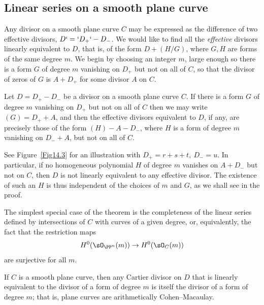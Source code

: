 \subsection{Linear series on a smooth plane curve}\label{linear series on smooth plane curves}

Any divisor on a smooth plane curve $C$ may be expressed as the difference of
%
two
effective divisors,
$D`=` D_{+}`-\nobreak D_{-}$. We would like to find all the \emph{effective} divisors
%
linearly equivalent
to $D$, that is, of the form
$D + (H/G)$, where $G, H$ are forms of the same degree $m$. We begin by choosing
an integer $m$, large enough so there is a form $G$ of degree $m$ vanishing on $D_+$ but not on all of $C$, so
that the divisor of zeros of $G$ is $A+D_+$ for some divisor $A$ on $C$.

\begin{theorem}\label{equiv on smooth plane curve}
Let $D= D_{+}-D_{-}$ be a divisor on
a
smooth plane curve $C$. If
there is a form $G$ of degree $m$ vanishing on $D_{+}$ but not on all of $C$
then we may write $(G) = D_{+}+A$, and then
the effective divisors equivalent to $D$, if any, are precisely those
of the form $(H) - A -D_{-}$, where $H$
is a form of degree $m$ vanishing on $D_{-}+A$, but not on all of $C$.
\end{theorem}

See Figure~\ref{Fig14.3} for an illustration with $D_+ = r+s+t, \ D_- = u$.
In particular, if no homogeneous polynomial $H$ of degree $m$ vanishes on  $A + D_{-}$ but not on $C$, then $D$ is not linearly equivalent to any effective divisor. The existence of such an $H$ is thus independent of the choices of $m$ and $G$, as we shall see in the proof.

The simplest special case of the theorem is the completeness
%
of the linear series defined
by intersections of $C$ with curves of a given degree,
or, equivalently, the fact that the restriction maps
$$
H^{0}(\sO_{\PP^{n}}(m)) \to H^{0}(\sO_{C}(m))
$$
are surjective for all $m$.

\begin{proposition}\label {completeness of hyperplanes on plane curve}
If $C$ is a smooth plane curve, then any Cartier divisor on $D$ that is linearly equivalent to the divisor of
a form of degree $m$ is itself the divisor of a form of degree $m$; that is, plane curves are
arithmetically Cohen--Macaulay.
%
\end{proposition}


